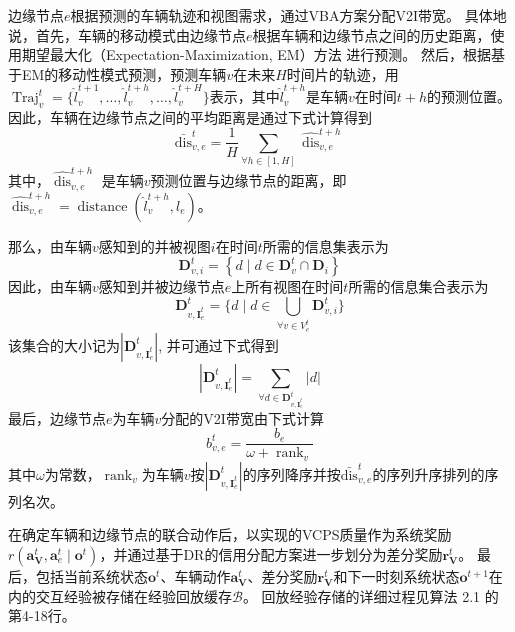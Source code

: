 边缘节点$e$根据预测的车辆轨迹和视图需求，通过VBA方案分配V2I带宽。
具体地说，首先，车辆的移动模式由边缘节点$e$根据车辆和边缘节点之间的历史距离，使用期望最大化（Expectation-Maximization, EM）方法\cite{hofmann2001unsupervised} 进行预测。
然后，根据基于EM的移动性模式预测，预测车辆$v$在未来$H$时间片的轨迹，用$\operatorname{Traj}_{v}^{t} = \{ \hat{l}_{v}^{t+1}, \dots, \hat{l}_{v}^{t+h}, \dots, \hat{l}_{v}^{t+H}\}$表示，其中$\hat{l}_{v}^{t+h}$是车辆$v$在时间$t+h$的预测位置。
因此，车辆在边缘节点之间的平均距离是通过下式计算得到
\begin{equation}
	\operatorname{\bar{dis}}_{v, e}^{t} = \frac{1}{H} {\sum_{\forall h \in [1, H]} \widehat{\operatorname{dis}}_{v, e}^{t+h}}
\end{equation}
其中，$\widehat{\operatorname{dis}}_{v, e}^{t+h}$ 是车辆$v$预测位置与边缘节点的距离，即$\widehat{\operatorname{dis}}_{v, e}^{t+h}=\operatorname{distance}(\hat{l}_{v}^{t+h}, l_{e})$。

那么，由车辆$v$感知到的并被视图$i$在时间$t$所需的信息集表示为 
\begin{equation}
	\mathbf{D}_{v, i}^{t} = \left\{ d \mid  d \in \mathbf{D}_{v}^t \cap  \mathbf{D}_i \right\}
\end{equation}
因此，由车辆$v$感知到并被边缘节点$e$上所有视图在时间$t$所需的信息集合表示为 
\begin{equation}
	\mathbf{D}_{v, {\mathbf{I}_e^t}}^{t} = \{ d \mid  d \in \bigcup_{\forall v \in V_e^t} \mathbf{D}_{v, i}^{t}\}
\end{equation}
\noindent 该集合的大小记为$|\mathbf{D}_{v, {\mathbf{I}_e^t}}^{t}|$, 并可通过下式得到
\begin{equation}
	|\mathbf{D}_{v, {\mathbf{I}_e^t}}^{t}| = \sum_{\forall d \in \mathbf{D}_{v, {\mathbf{I}_e^t}}^{t}}|d|
\end{equation}
最后，边缘节点$e$为车辆$v$分配的V2I带宽由下式计算 
\begin{equation}
	b_{v, e}^{t} =\frac{b_{e}} {\omega+\operatorname{rank}_{v}}
\end{equation}
\noindent 其中$\omega$为常数，$\operatorname{rank}_{v}$为车辆$v$按$| \mathbf{D}_{v, {\mathbf{I}_e^t}}^{t}|$的序列降序并按$\operatorname{\bar{dis}}_{v, e}^{t}$的序列升序排列的序列名次。

在确定车辆和边缘节点的联合动作后，以实现的VCPS质量作为系统奖励$r\left(\boldsymbol{a}_{\mathbf{V}}^{t},\boldsymbol{a}_{e}^{t} \mid \boldsymbol{o}^{t}\right)$，并通过基于DR的信用分配方案进一步划分为差分奖励$\boldsymbol{r}_{\mathbf{V}}^{t}$。
最后，包括当前系统状态$\boldsymbol{o}^{t}$、车辆动作$\boldsymbol{a}_{\mathbf{V}}^{t}$、差分奖励$\boldsymbol{r}_{\mathbf{V}}^{t}$和下一时刻系统状态$\boldsymbol{o}^{t+1}$在内的交互经验被存储在经验回放缓存$\mathcal{B}$。
回放经验存储的详细过程见算法 2.1 的第4-18行。

